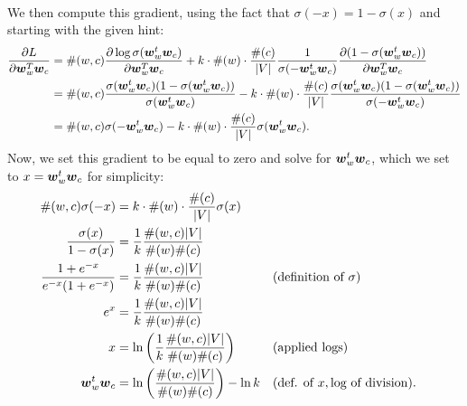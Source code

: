 \documentclass[11pt,a4paper]{article}
\begin{document}
\begin{enumerate}[label=(\alph*)]
\begin{align*}
          \end{align*}
          We then compute this gradient, using the fact that
          $\sigma(-x) = 1 - \sigma(x)$ and starting with the given hint:
          \begin{align*}
              \frac{\partial L}{\partial {\boldsymbol{w}}_w^T{\boldsymbol{w}}_c} & =  \#(w,c)\frac{\partial \log \sigma({\boldsymbol{w}}_{w}^t{\boldsymbol{w}}_{c})}{\partial {\boldsymbol{w}}_w^T{\boldsymbol{w}}_c} + k\cdot\#(w)\cdot\frac{\#(c)}{|V|}\frac{1}{\sigma(-{\boldsymbol{w}}_{w}^t{\boldsymbol{w}}_c)}\frac{\partial (1 - \sigma({\boldsymbol{w}}_{w}^t{\boldsymbol{w}}_c))}{\partial {\boldsymbol{w}}_w^T{\boldsymbol{w}}_c}             \\
                                                       & =  \#(w,c)\frac{\sigma({\boldsymbol{w}}_{w}^t{\boldsymbol{w}}_{c})(1 - \sigma({\boldsymbol{w}}_{w}^t{\boldsymbol{w}}_{c}))}{\sigma{({\boldsymbol{w}}_{w}^t{\boldsymbol{w}}_{c})}}  - k\cdot\#(w)\cdot\frac{\#(c)}{|V|}\frac{\sigma({\boldsymbol{w}}_{w}^t{\boldsymbol{w}}_{c})(1 - \sigma({\boldsymbol{w}}_{w}^t{\boldsymbol{w}}_{c}))}{\sigma{(-{\boldsymbol{w}}_{w}^t{\boldsymbol{w}}_{c})}} \\
                                                       & =  \#(w,c)\sigma(-{\boldsymbol{w}}_{w}^t{\boldsymbol{w}}_{c}) - k\cdot\#(w)\cdot\frac{\#(c)}{|V|}\sigma({\boldsymbol{w}}_{w}^t{\boldsymbol{w}}_{c}).
          \end{align*}
          Now, we set this gradient to be equal to zero and solve for
          ${\boldsymbol{w}}_{w}^t{\boldsymbol{w}}_{c}$, which we set to $x = {\boldsymbol{w}}_{w}^t{\boldsymbol{w}}_{c}$ for
          simplicity:
          \begin{align*}
              \#(w,c)\sigma(-x)                 & = k\cdot\#(w)\cdot\frac{\#(c)}{|V|}\sigma(x)                                                                  \\
              \frac{\sigma(x)}{1 - \sigma(x)}   & = \frac{1}{k}\frac{\#(w,c)|V|}{\#(w)\#(c)}                                                                    \\
              \frac{1+e^{-x}}{e^{-x}(1+e^{-x})} & = \frac{1}{k}\frac{\#(w,c)|V|}{\#(w)\#(c)}                  &  & (\text{definition of }\sigma)                \\
              e^{x}                             & = \frac{1}{k}\frac{\#(w,c)|V|}{\#(w)\#(c)}                                                                    \\
              x                                 & = \ln\left(\frac{1}{k}\frac{\#(w,c)|V|}{\#(w)\#(c)}\right) &  & (\text{applied logs})                        \\
              {\boldsymbol{w}}_{w}^t{\boldsymbol{w}}_{c}                  & = \ln\left(\frac{\#(w,c)|V|}{\#(w)\#(c)}\right) - \ln k   &  & (\text{def. of } x, \text{log of division}). \\
          \end{align*}

\end{enumerate}
\end{document}
